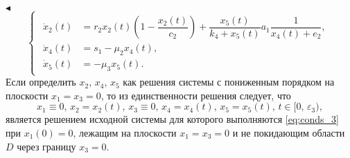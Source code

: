 \documentclass[12pt,a4paper]{extarticle}
\renewenvironment{proof}{\noindent$\blacktriangleleft$}{}
\theoremstyle{definition}
\theoremstyle{definition}
\theoremstyle{definition}
\begin{document}
\begin{proof}
		\begin{equation*}
			\begin{cases}
				\begin{aligned}
					\dot{x}_2(t) &= r_2x_2(t)\left(1-\dfrac{x_2(t)}{c_2}\right)+\dfrac{x_5(t)}{k_4+x_5(t)}a_1\dfrac{1}{x_4(t)+e_2},\\
					\dot{x}_4(t) &= s_1-\mu_2x_4(t),\\
					\dot{x}_5(t) &= -\mu_3x_5(t).
				\end{aligned}
			\end{cases}
		\end{equation*}
		Если определить $x_2,\, x_4,\, x_5$ как решения системы с пониженным порядком на плоскости $x_1=x_3=0$, то из единственности решения следует, что
		\[x_1\equiv0,\, x_2=x_2(t),\, x_3\equiv0,\, x_4=x_4(t),\, x_5=x_5(t),\, t\in[0,\,\varepsilon_3),\]
		является решением исходной системы для которого выполняются \ref{eq:conds_3} при $x_1(0)=0$, лежащим на плоскости $x_1=x_3=0$ и не покидающим области $D$ через границу $x_3=0$.
		
		

\end{proof}
\end{document}
